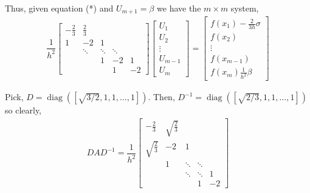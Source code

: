 \documentclass[10pt]{article}
\begin{document}
\begin{solution}[Solution]
\begin{enumerate}
        Thus, given equation (*) and \( U_{m+1} = \beta \) we have the \( m\times m \) system,
        \begin{align*}
            \dfrac{1}{h^2}
            \left[\begin{array}{ccccccc}
                -\frac{2}{3} & \frac{2}{3} \\
                1 & -2 & 1 \\
                & \ddots & \ddots & \ddots \\
                && 1 & -2 & 1 \\
                &&& 1 & -2
            \end{array}\right]
            \left[\begin{array}{c}
                U_1 \\ U_2 \\ \vdots \\ U_{m-1} \\ U_m
            \end{array}\right]
            =
            \left[\begin{array}{c}
                f(x_1) - \frac{2}{3h}\sigma \\ f(x_2) \\ \vdots \\ f(x_{m-1}) \\ f(x_m)  \frac{1}{h^2}\beta
            \end{array}\right]
        \end{align*}

         Pick, \( D = \operatorname{diag}([\sqrt{3/2}, 1, 1, \ldots, 1]) \). Then, \( D^{-1} = \operatorname{diag}([\sqrt{2/3},1,1,\ldots,1]) \) so clearly,
        \begin{align*}
            DAD^{-1} = 
            \dfrac{1}{h^2}
            \left[\begin{array}{ccccc}
                -\frac{2}{3} & \sqrt{\frac{2}{3}}    \\
                \sqrt{\frac{2}{3}}  & -2 & 1 \\
                & 1 & \ddots & \ddots    \\
                && \ddots & \ddots & 1    \\
                &&& 1  & -2 
            \end{array}\right] 
        \end{align*}

\end{enumerate}

\end{solution}
\end{document}
